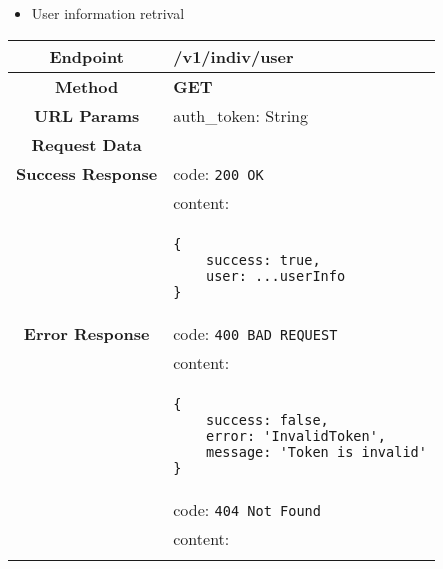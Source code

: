     \begin{itemize}
        \item User information retrival
    \end{itemize}
    \begin{adjustwidth}{1cm}{}
        \begin{longtable}{|c|l|}
            \hline
            \textbf{Endpoint} & /v1/indiv/user \\
            \hline
            \textbf{Method} & \textbf{GET} \\
            \hline
            \textbf{URL Params} &  auth\_token: String \\
            \hline
            \textbf{Request Data} &  \\
            \hline
            \textbf{Success Response} & code: \texttt{200 OK} \\
            &                           content: \\
            & \begin{minipage}[t]{0.5\textwidth}
                \begin{adjustwidth}{1.5cm}{}
                \begin{verbatim}
{
    success: true, 
    user: ...userInfo
}
                \end{verbatim}
                \end{adjustwidth}
              \end{minipage} \\
              \hline
            \textbf{Error Response} & code: \texttt{400 BAD REQUEST} \\
            &                         content: \\
            & \begin{minipage}[t]{0.7\textwidth}
                \begin{adjustwidth}{1.5cm}{}
                \begin{verbatim}
{
    success: false, 
    error: 'InvalidToken',
    message: 'Token is invalid'
}
                \end{verbatim}
                \end{adjustwidth}
              \end{minipage} \\
              \hline
              & code: \texttt{404 Not Found} \\
            &                         content: \\
            & \begin{minipage}[t]{0.7\textwidth}

\end{minipage}
\end{longtable}
\end{adjustwidth}
